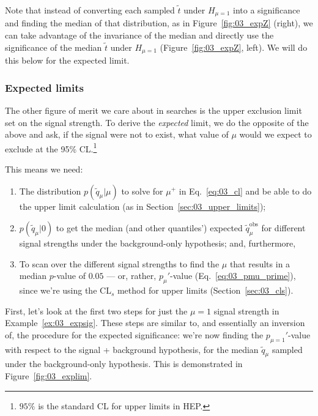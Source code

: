 Note that instead of converting each sampled $\tilde{t}$ under $H_{\mu=1}$ into a significance and finding the median of that distribution, as in Figure~\ref{fig:03_expZ} (right), we can take advantage of the invariance of the median and directly use the significance of the median $\tilde{t}$ under $H_{\mu=1}$ (Figure~\ref{fig:03_expZ}, left).
We will do this below for the expected limit.

\subsubsection{Expected limits}

The other figure of merit we care about in searches is the upper exclusion limit set on the signal strength.
To derive the \textit{expected} limit, we do the opposite of the above and ask, if the signal were not to exist, what value of $\mu$ would we expect to exclude at the 95\% CL.\footnote{$95\%$ is the standard CL for upper limits in HEP.}

This means we need:
\begin{enumerate}
  \item The distribution $p(\tilde{q}_\mu|\mu)$ to solve for $\mu^+$ in Eq.~\ref{eq:03_cl} and be able to do the upper limit calculation (as in Section~\ref{sec:03_upper_limits});
  \item $p(\tilde{q}_\mu|0)$ to get the median (and other quantiles') expected $\tilde{q}_\mu^{\mathrm{obs}}$ for different signal strengths under the background-only hypothesis; and, furthermore,
  \item To scan over the different signal strengths to find the $\mu$ that results in a median $p$-value of $0.05$ --- or, rather, $p_\mu'$-value (Eq.~\ref{eq:03_pmu_prime}), since we're using the CL$_s$ method for upper limits (Section~\ref{sec:03_cls}).
\end{enumerate}

First, let's look at the first two steps for just the $\mu = 1$ signal strength in Example~\ref{ex:03_expsig}.
These steps are similar to, and essentially an inversion of, the procedure for the expected significance: we're now finding the $p_{\mu=1}'$-value with respect to the signal + background hypothesis, for the median $\tilde{q}_\mu$ sampled under the background-only hypothesis.
This is demonstrated in Figure~\ref{fig:03_explim}.

